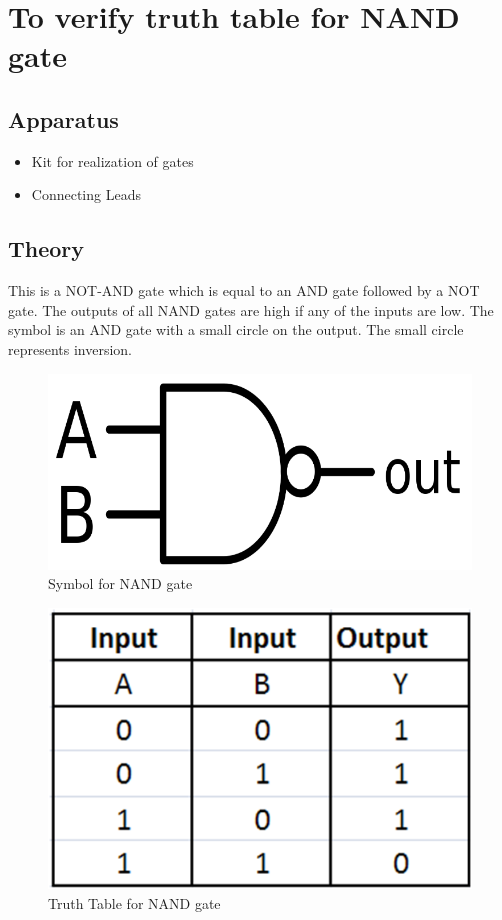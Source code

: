 \chapter{To verify truth table for NAND gate}


\section{Apparatus}
	\begin{itemize}
		\tightlist
		\item Kit for realization of gates
		\item Connecting Leads
	\end{itemize}

\section{Theory}
	This is a NOT-AND gate which is equal to an AND gate followed by a NOT gate. The outputs of all NAND gates are high if any of the inputs are low. The symbol is an AND gate with a small circle on the output. The small circle represents inversion.
	\begin{figure}[h]
		\centering
		\includegraphics{img/exp4/1}
		\caption{Symbol for NAND gate}
		\label{fig:4:1}
	\end{figure}
	\begin{figure}[h]
		\centering
		\includegraphics{img/exp4/2}
		\caption{Truth Table for NAND gate}
		\label{fig:4:2}
	\end{figure}
	
